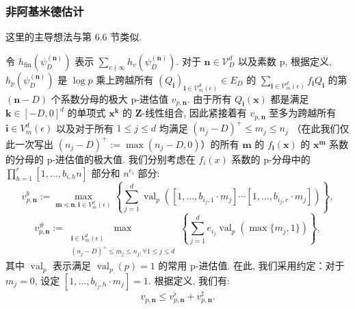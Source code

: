 \subsubsection{非阿基米德估计}\label{sec:8.2.29}

这里的主导想法与第 6.6 节类似.

令 \(h_{\text{fin}}(\psi_D^{(\mathbf{n})})\) 表示 \(\sum_{v \nmid \infty} h_v(\psi_D^{(\mathbf{n})})\). 
对于 \(\mathbf{n} \in \mathcal{V}_D^d\) 以及素数 p, 根据定义, 
\(h_p(\psi_D^{(\mathbf{n})})\) 是 \(\log p\) 乘上跨越所有 \((Q_{\mathbf{i}})_{\mathbf{i} \in \mathcal{V}_m^d(\epsilon)} \in E_D\) 的 \(\sum_{\mathbf{i} \in \mathcal{V}_m^d(\epsilon)} f_{\mathbf{i}} Q_{\mathbf{i}}\) 的第 \((\mathbf{n} - D)\) 个系数分母的极大 p-进估值 \(v_{p,\mathbf{n}}\). 
由于所有 \(Q_{\mathbf{i}}(\mathbf{x})\) 都是满足 \(\mathbf{k} \in [-D, 0]^d\) 的单项式 \(\mathbf{x}^{\mathbf{k}}\) 的 \(\mathbf{Z}\)-线性组合, 
因此紧接着有 \(v_{p,\mathbf{n}}\) 
至多为跨越所有 \(\mathbf{i}\in V_m^d(\epsilon)\) 以及对于所有 \(1\leq j\leq d\) 均满足 \((n_j - D)^+ \leq m_j \leq n_j\) （在此我们仅此一次写出 \((n_j - D)^+ := \max(n_j - D, 0)\)）的所有 \(\mathbf{m}\) 的 \(f_{\mathbf{i}}(\mathbf{x})\) 的 \(\mathbf{x}^{\mathbf{m}}\) 
系数的分母的 p-进估值的极大值. 
我们分别考虑在 \(f_i(x)\) 系数的 p-分母中的 \(\prod_{h=1}^r [1, \ldots, b_{i,h} n]\) 部分和 \(n^{e_i}\) 部分:
\[ v_{p,\mathbf{n}}^b := \max_{\mathbf{m} \preceq \mathbf{n}, \mathbf{i} \in V_m^d(\epsilon)} \left\{ \sum_{j=1}^d \operatorname{val}_p([1, \dots, b_{i_j, 1} \cdot m_j] \cdots [1, \dots, b_{i_j, r} \cdot m_j]) \right\}, \]
\[ v_{p,\mathbf{n}}^\# := \max_{\substack{\mathbf{i} \in V_m^d(\epsilon) \\ (n_j - D)^+ \leq m_j \leq n_j, \forall 1 \leq j \leq d}} \left\{ \sum_{j=1}^d e_{i_j} \operatorname{val}_p(\max\{m_j, 1\}) \right\}, \]
其中 \(\operatorname{val}_p\) 表示满足 \(\operatorname{val}_p(p) = 1\) 的常用 p-进估值. 
在此, 我们采用约定：对于 \(m_j = 0\), 设定 \([1, \ldots, b_{i_j,h} \cdot m_j] = 1\). 
根据定义, 我们有:
\begin{equation}\label{eq:8.2.30}
v_{p,\mathbf{n}} \le v_{p,\mathbf{n}}^{\flat} + v_{p,\mathbf{n}}^{\sharp}.
\end{equation}

